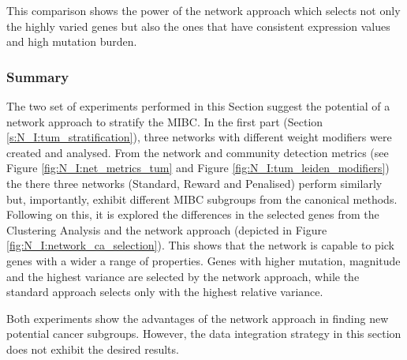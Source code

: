 This comparison shows the power of the network approach which selects not only the highly varied genes but also the ones that have consistent expression values and high mutation burden.

\subsubsection{Summary}

The two set of experiments performed in this Section suggest the potential of a network approach to stratify the MIBC. In the first part (Section \ref{s:N_I:tum_stratification}), three networks with different weight modifiers were created and analysed. From the network and community detection metrics (see Figure \ref{fig:N_I:net_metrics_tum} and Figure \ref{fig:N_I:tum_leiden_modifiers}) the there three networks (Standard, Reward and Penalised) perform similarly but, importantly, exhibit different MIBC subgroups from the canonical methods. Following on this, it is explored the differences in the selected genes from the Clustering Analysis and the network approach (depicted in Figure \ref{fig:N_I:network_ca_selection}). This shows that the network is capable to pick genes with a wider a range of properties. Genes with higher mutation, magnitude and the highest variance are selected by the network approach, while the standard approach selects only with the highest relative variance.

Both experiments show the advantages of the network approach in finding new potential cancer subgroups. However, the data integration strategy in this section does not exhibit the desired results.



